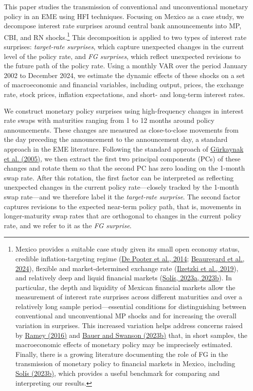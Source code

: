 \documentclass[\latexroot/\projectname]{subfiles}
\begin{document}
This paper studies the transmission of conventional and unconventional monetary policy in an EME using HFI techniques. Focusing on Mexico as a case study, we decompose interest rate surprises around central bank announcements into MP, CBI, and RN shocks.\footnote{Mexico provides a suitable case study given its small open economy status, credible inflation-targeting regime (\hyperlink{De Pooter et al. (2014)}{De Pooter et al., 2014}; \hyperlink{Beauregard et al. (2024)}{Beauregard et al., 2024}), flexible and market-determined exchange rate (\hyperlink{Ilzetzki et al. (2019)}{Ilzetzki et al., 2019}), and relatively deep and liquid financial markets (\hyperlink{Solis (2023b)}{Solís, 2023a, 2023b}). In particular, the depth and liquidity of Mexican financial markets allow the measurement of interest rate surprises across different maturities and over a relatively long sample period—essential conditions for distinguishing between conventional and unconventional MP shocks and for increasing the overall variation in surprises. This increased variation helps address concerns raised by \hyperlink{Ramey (2016)}{Ramey (2016)} and \hyperlink{Bauer and Swanson (2023b)}{Bauer and Swanson (2023b)} that, in short samples, the macroeconomic effects of monetary policy may be imprecisely estimated. Finally, there is a growing literature documenting the role of FG in the transmission of monetary policy to financial markets in Mexico, including \hyperlink{Solis (2023b)}{Solís (2023b)}, which provides a useful benchmark for comparing and interpreting our results.} This decomposition is applied to two types of interest rate surprises: \emph{target-rate surprises}, which capture unexpected changes in the current level of the policy rate, and \emph{FG surprises}, which reflect unexpected revisions to the future path of the policy rate. Using a monthly VAR over the period January 2002 to December 2024, we estimate the dynamic effects of these shocks on a set of macroeconomic and financial variables, including output, prices, the exchange rate, stock prices, inflation expectations, and short- and long-term interest rates.

We construct monetary policy surprises using high-frequency changes in interest rate swaps with maturities ranging from 1 to 12 months around policy announcements. These changes are measured as close-to-close movements from the day preceding the announcement to the announcement day, a standard approach in the EME literature. Following the standard approach of \hyperlink{Gürkaynak et al. (2005)}{Gürkaynak et al. (2005)}, we then extract the first two principal components (PCs) of these changes and rotate them so that the second PC has zero loading on the 1-month swap rate. After this rotation, the first factor can be interpreted as reflecting unexpected changes in the current policy rate—closely tracked by the 1-month swap rate—and we therefore label it the \emph{target-rate surprise}. The second factor captures revisions to the expected near-term policy path, that is, movements in longer-maturity swap rates that are orthogonal to changes in the current policy rate, and we refer to it as the \emph{FG surprise}. 
\end{document}
